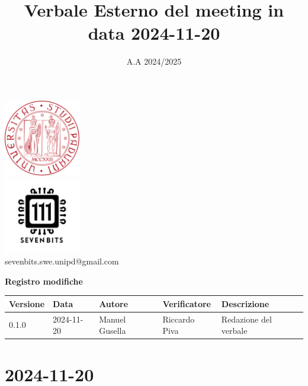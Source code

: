 \documentclass[12pt]{article}
\title{Verbale Esterno del meeting in data 2024-11-20}
\date{A.A 2024/2025}
\begin{document}
\maketitle
\begin{center}
\includegraphics[width=0.25\textwidth]{LogoUnipd}\\
\includegraphics[width=0.25\textwidth]{Sevenbitslogo}\\
sevenbits.swe.unipd@gmail.com\\
\vspace{2mm}

\textbf{Registro modifiche}\\
\vspace{2mm}
\begin{tabularx}{\textwidth}{|l|l|l|l|X|}
\hline
\textbf{Versione} & \textbf{Data} & \textbf{Autore} & \textbf{Verificatore} & \textbf{Descrizione} \\
\hline
0.1.0 & 2024-11-20 & Manuel Gusella & Riccardo Piva & Redazione del verbale\\
\hline

\end{tabularx}
\end{center}
\newpage
\tableofcontents
\newpage
\section{2024-11-20}
\end{document}

